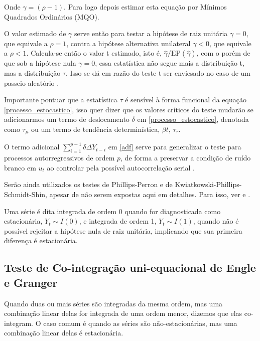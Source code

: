 \documentclass[a4paper,
               article,
               12pt,
               openany,
               oneside,
               english,
               brazil]{abntex2}
\numberwithin{equation}{section}
\begin{document}
    Onde $ \gamma = (\rho - 1) $. Para logo depois estimar esta equação por Mínimos Quadrados Ordinários (MQO).
   
    O valor estimado de $ \gamma $ serve então para testar a hipótese de raiz unitária $ \gamma = 0 $, que equivale a $ \rho = 1 $, contra a hipótese alternativa unilateral $ \gamma < 0 $, que equivale a $ \rho < 1 $. Calcula-se então o valor t estimado, isto é, $ \hat{\gamma} / \text{EP}(\hat{\gamma}) $, com o porém de que sob a hipótese nula $ \gamma = 0 $, essa estatística não segue mais a distribuição t, mas a distribuição $ \tau $. Isso se dá em razão do teste t ser enviesado no caso de um passeio aleatório \cite[p.~748-749]{gujarati}.

    Importante pontuar que a estatística $ \tau $ é sensível à forma funcional da equação \eqref{processo_estocastico}, isso quer dizer que os valores críticos do teste mudarão se adicionarmos um termo de deslocamento $ \delta $ em \eqref{processo_estocastico}, denotada como $ \tau_{\mu} $ ou um termo de tendência determinística, $ \beta t $, $ \tau_{\tau} $.
   
    O termo adicional $ \sum_{i = 1}^{p-1}\delta \Delta Y_{t-i} $ em \eqref{adf} serve para generalizar o teste para processos autorregressivos de ordem $ p $, de forma a preservar a condição de ruído branco em $ u_t $ ao controlar pela possível autocorrelação serial \cite[p.~40]{gustavo}.

    Serão ainda utilizados os testes de Phillips-Perron e de Kwiatkowski-Phillips-Schmidt-Shin, apesar de não serem expostas aqui em detalhes. Para isso, ver \textcite{pp} e \textcite{kpss}.

    Uma série é dita integrada de ordem 0 quando for diagnosticada como estacionária, $ Y_t \sim I(0) $, e integrada de ordem 1, $ Y_t \sim I(1) $, quando não é possível rejeitar a hipótese nula de raiz unitária, implicando que sua primeira diferença é estacionária.

    \subsection{Teste de Co-integração uni-equacional de Engle e Granger}

    Quando duas ou mais séries são integradas da mesma ordem, mas uma combinação linear delas for integrada de uma ordem menor, dizemos que elas co-integram. O caso comum é quando as séries são não-estacionárias, mas uma combinação linear delas é estacionária.
    
\end{document}
